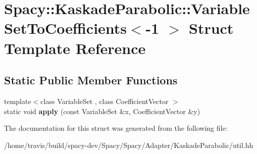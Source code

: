 \hypertarget{structSpacy_1_1KaskadeParabolic_1_1VariableSetToCoefficients_3-1_01_4}{\section{Spacy\-:\-:Kaskade\-Parabolic\-:\-:Variable\-Set\-To\-Coefficients$<$-\/1 $>$ Struct Template Reference}
\label{structSpacy_1_1KaskadeParabolic_1_1VariableSetToCoefficients_3-1_01_4}
}
\subsection*{Static Public Member Functions}
\begin{DoxyCompactItemize}
\item 
\hypertarget{structSpacy_1_1KaskadeParabolic_1_1VariableSetToCoefficients_3-1_01_4_a4113981c3dcb103ff3645884029adb0a}{{\footnotesize template$<$class Variable\-Set , class Coefficient\-Vector $>$ }\\static void {\bfseries apply} (const Variable\-Set \&x, Coefficient\-Vector \&y)}\label{structSpacy_1_1KaskadeParabolic_1_1VariableSetToCoefficients_3-1_01_4_a4113981c3dcb103ff3645884029adb0a}

\end{DoxyCompactItemize}


The documentation for this struct was generated from the following file\-:\begin{DoxyCompactItemize}
\item 
/home/travis/build/spacy-\/dev/\-Spacy/\-Spacy/\-Adapter/\-Kaskade\-Parabolic/util.\-hh\end{DoxyCompactItemize}
